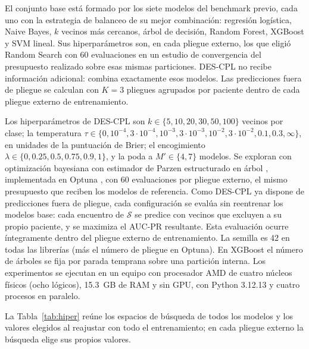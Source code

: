 \documentclass[pdflatex,sn-mathphys-num]{sn-jnl}
\theoremstyle{plain}
\begin{document}
El conjunto base está formado por los siete modelos del benchmark previo, cada uno con la estrategia de balanceo de su mejor combinación: regresión logística, Naive Bayes, $k$ vecinos más cercanos, árbol de decisión, Random Forest, XGBoost y SVM lineal. Sus hiperparámetros son, en cada pliegue externo, los que eligió Random Search con 60 evaluaciones en un estudio de convergencia del presupuesto realizado sobre esas mismas particiones. DES-CPL no recibe información adicional: combina exactamente esos modelos. Las predicciones fuera de pliegue se calculan con $K=3$ pliegues agrupados por paciente dentro de cada pliegue externo de entrenamiento.

Los hiperparámetros de DES-CPL son $k\in\{5, 10, 20, 30, 50, 100\}$ vecinos por clase; la temperatura $\tau\in\{0, 10^{-4}, 3\cdot10^{-4}, 10^{-3}, 3\cdot10^{-3}, 10^{-2}, 3\cdot10^{-2}, 0.1, 0.3, \infty\}$, en unidades de la puntuación de Brier; el encogimiento $\lambda\in\{0, 0.25, 0.5, 0.75, 0.9, 1\}$, y la poda a $M'\in\{4, 7\}$ modelos. Se exploran con optimización bayesiana con estimador de Parzen estructurado en árbol \cite{bib_bergstra_tpe}, implementada en Optuna \cite{bib_optuna}, con 60 evaluaciones por pliegue externo, el mismo presupuesto que reciben los modelos de referencia. Como DES-CPL ya dispone de predicciones fuera de pliegue, cada configuración se evalúa sin reentrenar los modelos base: cada encuentro de $\mathcal{S}$ se predice con vecinos que excluyen a su propio paciente, y se maximiza el AUC-PR resultante. Esta evaluación ocurre íntegramente dentro del pliegue externo de entrenamiento. La semilla es 42 en todas las librerías (más el número de pliegue en Optuna). En XGBoost el número de árboles se fija por parada temprana sobre una partición interna. Los experimentos se ejecutan en un equipo con procesador AMD de cuatro núcleos físicos (ocho lógicos), 15.3~GB de RAM y sin GPU, con Python 3.12.13 y cuatro procesos en paralelo.

La Tabla~\ref{tab:hiper} reúne los espacios de búsqueda de todos los modelos y los valores elegidos al reajustar con todo el entrenamiento; en cada pliegue externo la búsqueda elige sus propios valores.
\end{document}
